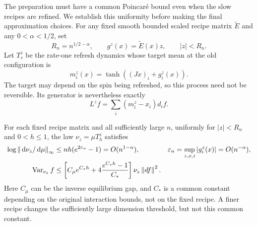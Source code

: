The preparation must have a common Poincar\'e bound even when the slow
recipes are refined.  We establish this uniformity before making the
final approximation choices.  For any fixed smooth bounded scaled recipe matrix
$\widetilde E$ and any $0<\alpha<1/2$, set
\[
 R_n=n^{1/2-\alpha},\qquad
 g^z(x)=\widetilde E(x)z,\qquad |z|<R_n.
\]
Let $T_s^z$ be the rate-one refresh dynamics whose target mean at
the old configuration is
\[
 m_i^z(x)=\tanh((Jx)_i+g_i^z(x)).
\]
The target may depend on the spin being refreshed, so this process
need not be reversible.  Its generator is nevertheless exactly
\begin{equation}
 L^z f=\sum_i(m_i^z-x_i)d_if.
 \label{eq:cutoff-preparation-generator}
\end{equation}

\begin{lemma}
\label{lem:cutoff-preparation}
For each fixed recipe matrix and all sufficiently large $n$,
uniformly for $|z|<R_n$ and $0<h\le1$, the law
$\nu_z=\mu T_h^z$ satisfies
\begin{align}
 \log\left\lVert \,\mathrm d\nu_z/\,\mathrm d\mu\right\rVert_\infty
   &\le nh(e^{2\varepsilon_n}-1)=O(n^{1-\alpha}),
   &\varepsilon_n&=\sup_{z,x,i}|g_i^z(x)|=O(n^{-\alpha}),
   \label{eq:cutoff-preparation-density}\\
 \operatorname{Var}_{\nu_z}f
   &\le\left[C_\mu e^{C_*h}
         +4\frac{e^{C_*h}-1}{C_*}\right]\nu_z\left\lVert df\right\rVert^2.
   \label{eq:cutoff-preparation-poincare}
\end{align}
Here $C_\mu$ can be the inverse equilibrium gap, and $C_*$ is a
common constant depending on the original interaction bounds, not
on the fixed recipe.  A finer recipe changes the sufficiently large
dimension threshold, but not this common constant.
\end{lemma}

